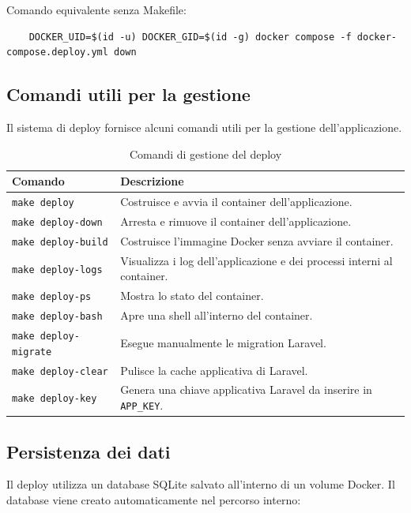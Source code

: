 \documentclass[a4paper,10pt]{article}
\begin{document}
Comando equivalente senza Makefile:

\begin{lstlisting}
    DOCKER_UID=$(id -u) DOCKER_GID=$(id -g) docker compose -f docker-compose.deploy.yml down
\end{lstlisting}

\subsection{Comandi utili per la gestione}
Il sistema di deploy fornisce alcuni comandi utili per la gestione dell'applicazione.

\begin{table}[H]
\centering
\renewcommand{\arraystretch}{1.3}
\begin{tabularx}{\textwidth}{|l|X|}
\hline
\textbf{Comando} & \textbf{Descrizione} \\ \hline
\texttt{make deploy} & Costruisce e avvia il container dell'applicazione. \\ \hline
\texttt{make deploy-down} & Arresta e rimuove il container dell'applicazione. \\ \hline
\texttt{make deploy-build} & Costruisce l'immagine Docker senza avviare il container. \\ \hline
\texttt{make deploy-logs} & Visualizza i log dell'applicazione e dei processi interni al container. \\ \hline
\texttt{make deploy-ps} & Mostra lo stato del container. \\ \hline
\texttt{make deploy-bash} & Apre una shell all'interno del container. \\ \hline
\texttt{make deploy-migrate} & Esegue manualmente le migration Laravel. \\ \hline
\texttt{make deploy-clear} & Pulisce la cache applicativa di Laravel. \\ \hline
\texttt{make deploy-key} & Genera una chiave applicativa Laravel da inserire in \texttt{APP\_KEY}. \\ \hline
\end{tabularx}
\caption{Comandi di gestione del deploy}
\end{table}

\subsection{Persistenza dei dati}
Il deploy utilizza un database SQLite salvato all'interno di un volume Docker. Il database viene creato automaticamente nel percorso interno:
\end{document}
